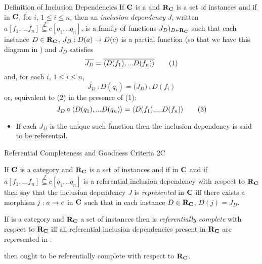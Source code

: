 \begin{frame}{Definition of Inclusion Dependencies}
If $\textbf{C}$ is a \datacatw and $\textbf{R}_{\textbf{C}}$ is a set of instances 
and if
\incdsetup
in $\textbf{C}$, for $i$, $1 \leq i \leq n$, then an \textit{inclusion dependency} $J$, written $a[f_1,...f_n] \overset{J}{\subseteq} c[q_1,..q_n]$, is a family of functions $J_D)_{D \in \textbf{R}_{\textbf{C}}}$
such that each instance $D \in \textbf{R}_{\textbf{C}}$, $J_D: D(a) \rightarrow D(c)$ is a partial function
(so that we have this diagram in \Par \incdresolution
) 
and $J_D$ satisfies
\begin{equation}
\overline{J_D} = \overline{\langle D(f_1),...D(f_n)\rangle} \tag{1}
\end{equation}
 and, for each $i$, $1 \leq i \leq n$,
\begin{equation}
  J_D \comp D(q_i) = \overline(J_D) \comp D(f_i) \tag{2}
\end{equation}
  or, equivalent to (2) in the presence of (1): 
\begin{equation}
J_D \circ \langle D(q_1),...D(q_n)\rangle = \langle D(f_1),...D(f_n)\rangle \tag{3}
\end{equation}

\medskip
\begin{itemize}
\item If each $J_D$ is the unique such function then the inclusion dependency is said to be referential. 
\end{itemize}
\end{frame}

\begin{frame}{Referential Completeness and Goodness Criteria 2C}
\begin{definition}
If $\textbf{C}$ is a category and $\textbf{R}_{\textbf{C}}$ is a set of instances and if
\fnsourceqnsource
in $\textbf{C}$ and if $a[f_1,...f_n] \overset{J}{\subseteq} c[q_1,..q_n]$ is a referential inclusion dependency
with respect  to $\textbf{R}_{\textbf{C}}$ then say that the inclusion dependency $J$ is \textit{represented} in $\textbf{C}$
iff there exists a morphism $j:a \rightarrow c$ in $\textbf{C}$ such that in each instance $D \in \textbf{R}_{\textbf{C}}$, $D(j) = J_D$. 
\end{definition}
If \catcw is a category and $\textbf{R}_{\textbf{C}}$ a set of instances then 
\catcw is \textit{referentially complete} with respect to $\textbf{R}_{\textbf{C}}$ 
iff all referential inclusion dependencies present in $\textbf{R}_{\textbf{C}}$ are represented in \catc.

 \IfSforGammaCwithRCwords 
then \catcw ought to be referentially complete with respect to $\textbf{R}_{\textbf{C}}$.
\end{frame}


